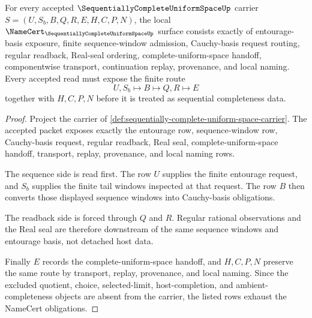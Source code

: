 \begin{theorem}
\label{thm:sequentially-complete-uniform-space-namecert-obligations}
For every accepted $\SequentiallyCompleteUniformSpaceUp$ carrier $S=(U,S_b,B,Q,R,E,H,C,P,N)$, the local $\NameCert_{\SequentiallyCompleteUniformSpaceUp}$ surface consists exactly of entourage-basis exposure, finite sequence-window admission, Cauchy-basis request routing, regular readback, Real-seal ordering, complete-uniform-space handoff, componentwise transport, continuation replay, provenance, and local naming. Every accepted read must expose the finite route
$$
U,S_b \longmapsto B \longmapsto Q,R \longmapsto E
$$
together with $H,C,P,N$ before it is treated as sequential completeness data.
\end{theorem}
\begin{proof}
Project the carrier of \autoref{def:sequentially-complete-uniform-space-carrier}. The accepted packet exposes exactly the entourage row, sequence-window row, Cauchy-basis request, regular readback, Real seal, complete-uniform-space handoff, transport, replay, provenance, and local naming rows.

The sequence side is read first. The row $U$ supplies the finite entourage request, and $S_b$ supplies the finite tail windows inspected at that request. The row $B$ then converts those displayed sequence windows into Cauchy-basis obligations.

The readback side is forced through $Q$ and $R$. Regular rational observations and the Real seal are therefore downstream of the same sequence windows and entourage basis, not detached host data.

Finally $E$ records the complete-uniform-space handoff, and $H,C,P,N$ preserve the same route by transport, replay, provenance, and local naming. Since the excluded quotient, choice, selected-limit, host-completion, and ambient-completeness objects are absent from the carrier, the listed rows exhaust the NameCert obligations.
\end{proof}

